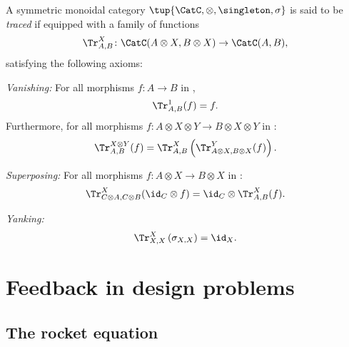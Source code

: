 \begin{ctdefinition}
    A symmetric monoidal category $\tup{\CatC, \otimes, \singleton, \sigma}$ is said to be \emph{traced} if equipped with a family of functions
    \begin{equation}
        \Tr_{A,B}^X\colon \CatC(A\otimes X, B\otimes X)\to \CatC(A,B),
    \end{equation}
    satisfying the following axioms:
    \begin{compactenum}
        \item \emph{Vanishing:} For all morphisms $f\colon A\to B$ in \CatC,
        \begin{equation}
            \label{eq:vanishing_1}
            \Tr_{A,B}^1(f)=f.
        \end{equation}
        Furthermore, for all morphisms $f\colon A\otimes X \otimes Y \to B\otimes X \otimes Y$ in \CatC:
        \begin{equation}
            \label{eq:vanishing_2}
            \Tr_{A,B}^{X\otimes Y}(f)=\Tr_{A,B}^X\left(
            \Tr_{A\otimes X,B\otimes X}^Y(f)\right).
        \end{equation}
        \item \emph{Superposing:} For all morphisms $f\colon A\otimes X\to B\otimes X$ in \CatC:
        \begin{equation}
            \label{eq:superposing}
            \Tr_{C\otimes A,C\otimes B}^{X}(\id_C\otimes f)=\id_C\otimes \Tr_{A,B}^X(f).
        \end{equation}
        \item \emph{Yanking:}
        \begin{equation}
            \label{eq:yanking}
            \Tr_{X,X}^X\left(\sigma_{X,X}\right)=\id_X.
        \end{equation}
    \end{compactenum}
\end{ctdefinition}


\section{Feedback in design problems}
\label{sec:feedbackindesign}

\subsection{The rocket equation}

